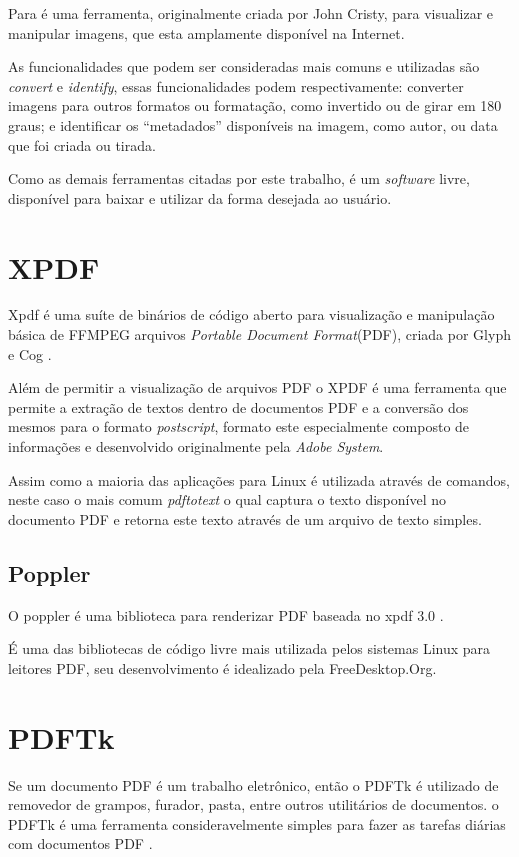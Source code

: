 Para \cite{TESLA} é uma ferramenta, originalmente criada por John Cristy, para visualizar e manipular imagens, que esta amplamente disponível na Internet.

As funcionalidades que podem ser consideradas mais comuns e utilizadas são \textit{convert} e \textit{identify}, essas funcionalidades podem respectivamente: converter imagens para outros formatos ou formatação, como invertido ou de girar em 180 graus; e identificar os ``metadados'' disponíveis na imagem, como autor, ou data que foi criada ou tirada.

Como as demais ferramentas citadas por este trabalho, é um \textit{software} livre, disponível para baixar e utilizar da forma desejada ao usuário.


\section{XPDF}

Xpdf é uma suíte de binários de código aberto para visualização e manipulação básica de FFMPEG arquivos \textit{Portable Document Format}(PDF), criada por Glyph e Cog \cite{GLYPH-COG}.

Além de permitir a visualização de arquivos PDF o XPDF é uma ferramenta que permite a extração de textos dentro de documentos PDF e a conversão dos mesmos para o formato \textit{postscript}, formato este especialmente composto de informações e desenvolvido originalmente pela \textit{Adobe System}.

Assim como a maioria das aplicações para Linux é utilizada através de comandos, neste caso o mais comum \textit{pdftotext} o qual captura o texto disponível no documento PDF e retorna este texto através de um arquivo de texto simples.


\subsection{Poppler}

O poppler é uma biblioteca para renderizar PDF baseada no xpdf 3.0 \cite{JOHNSON}.

É uma das bibliotecas de código livre mais utilizada pelos sistemas Linux para leitores PDF, seu desenvolvimento é idealizado pela FreeDesktop.Org.


\section{PDFTk}

Se um documento PDF é um trabalho eletrônico, então o PDFTk é utilizado de removedor de grampos, furador, pasta, entre outros utilitários de documentos. o PDFTk é uma ferramenta consideravelmente simples para fazer as tarefas diárias com documentos PDF \cite{STEWARD}.

